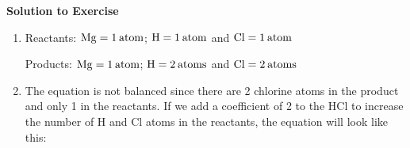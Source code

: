 {\begin{mdframed}[linewidth=4, leftmargin=40, rightmargin=40]
\begin{exercise}
        
        \vspace{5pt}
        \label{m38726*solfhsst!!!underscore!!!id327}\noindent\textbf{Solution to Exercise } \label{m38726*listfhsst!!!underscore!!!id327}\begin{enumerate}[noitemsep, label=\textbf{Step} \textbf{\arabic*}. ] 
            \leftskip=20pt\rightskip=\leftskip\item  
        \label{m38726*id63895}Reactants: \begin{math}\mathrm{Mg}=1\phantom{\rule{2pt}{0ex}}\mathrm{atom}\end{math}; \begin{math}\mathrm{H}=1\phantom{\rule{2pt}{0ex}}\mathrm{atom}\end{math} and \begin{math}\mathrm{Cl}=1\phantom{\rule{2pt}{0ex}}\mathrm{atom}\end{math}\par 
        \label{m38726*id63899}Products: \begin{math}\mathrm{Mg}=1\phantom{\rule{2pt}{0ex}}\mathrm{atom}\end{math}; \begin{math}\mathrm{H}=2\phantom{\rule{2pt}{0ex}}\mathrm{atoms}\end{math} and \begin{math}\mathrm{Cl}=2\phantom{\rule{2pt}{0ex}}\mathrm{atoms}\end{math}\par 
        \item  
        \label{m38726*id63906}The equation is not balanced since there are 2 chlorine atoms in the product and only 1 in the reactants. If we add a coefficient of 2 to the \begin{math}\mathrm{HCl}\end{math} to increase the number of \begin{math}\mathrm{H}\end{math} and \begin{math}\mathrm{Cl}\end{math} atoms in the reactants, the equation will look like this:
        \label{m38726*id63912}\nopagebreak\noindent{} 
    \ifthenelse{\lengthtest{\mymathboxwidth < \columnwidth}}{%
}
\end{enumerate}
\end{exercise}
\end{mdframed}}
